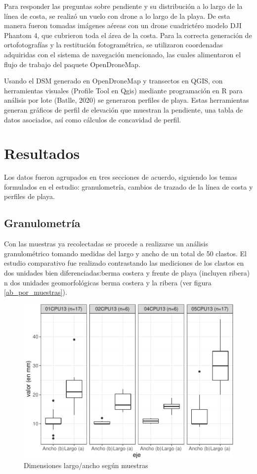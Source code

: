 \documentclass[11pt,]{article}
\begin{document}
Para responder las preguntas sobre pendiente y su distribución a lo
largo de la línea de costa, se realizó un vuelo con drone a lo largo de
la playa. De esta manera fueron tomadas imágenes aéreas con un drone
cuadrictéro modelo DJI Phantom 4, que cubrieron toda el área de la
costa. Para la correcta generación de ortofotografías y la restitución
fotogramétrica, se utilizaron coordenadas adquiridas con el sistema de
navegación mencionado, las cuales alimentaron el flujo de trabajo del
paquete OpenDroneMap.

Usando el DSM generado en OpenDroneMap y transectos en QGIS, con
herramientas visuales (Profile Tool en Qgis) mediante programación en R
para análisis por lote (Batlle, 2020) se generaron perfiles de playa.
Estas herramientas generan gráficos de perfil de elevación que muestran
la pendiente, una tabla de datos asociados, así como cálculos de
concavidad de perfil.

\section{Resultados}\label{resultados}

Los datos fueron agrupados en tres secciones de acuerdo, siguiendo los
temas formulados en el estudio: granulometría, cambios de trazado de la
línea de costa y perfiles de playa.

\subsection{Granulometría}\label{granulometruxeda}

Con las muestras ya recolectadas se procede a realizarse un análisis
granulométrico tomando medidas del largo y ancho de un total de 50
clastos. El estudio comparativo fue realizado contrastando las
mediciones de los clastos en dos unidades bien diferenciadas:berma
costera y frente de playa (incluyen ribera) n dos unidades
geomorfológicas berma costera y la ribera (ver figura
\ref{ab_por_muestras}).

\begin{figure}[H]
\includegraphics{manuscrito_files/figure-latex/unnamed-chunk-1-1} \caption{\label{ab_por_muestras}Dimensiones largo/ancho según muestras}\label{fig:unnamed-chunk-1}
\end{figure}
\end{document}
